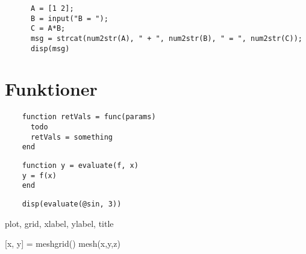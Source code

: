 \begin{frame}[fragile]
  \begin{example}[Strängar]
    \begin{verbatim}
      A = [1 2];
      B = input("B = ");
      C = A*B;
      msg = strcat(num2str(A), " + ", num2str(B), " = ", num2str(C));
      disp(msg)
    \end{verbatim}
  \end{example}
\end{frame}


\section{Funktioner}

\begin{frame}[fragile]
  \begin{verbatim}
    function retVals = func(params)
      todo
      retVals = something
    end
  \end{verbatim}
\end{frame}

\begin{frame}[fragile]
  \begin{verbatim}
    function y = evaluate(f, x)
    y = f(x)
    end
  \end{verbatim}

  \begin{verbatim}
    disp(evaluate(@sin, 3))
  \end{verbatim}
\end{frame}

plot, grid, xlabel, ylabel, title

[x, y] = meshgrid()
mesh(x,y,z)


